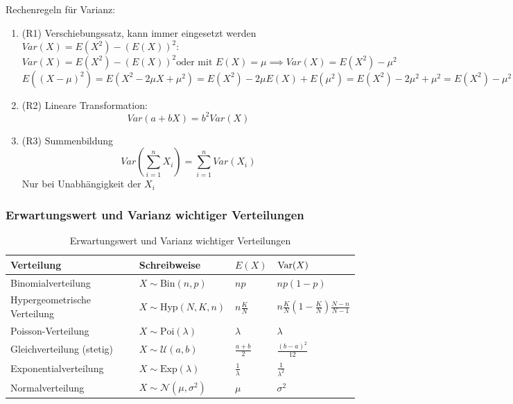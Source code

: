 \documentclass[a4paper]{article}
\begin{document}
Rechenregeln für Varianz:

\begin{enumerate}
    \item (R1) Verschiebungssatz, kann immer eingesetzt werden $Var(X) = E(X^2) - (E(X))^2$: 
    \[
    Var(X) = E(X^2) - (E(X))^2 \text{oder mit } E(X)=\mu \implies Var(X) = E(X^2) - \mu^2
    \]
    \[
    E((X-\mu)^2) = E(X^2-2\mu X + \mu^2) = E(X^2) -2\mu E(X) + E(\mu^2) = E(X^2) -2\mu^2 + \mu^2 = E(X^2) - \mu^2
    \]
    \item (R2) Lineare Transformation:
    \[
    Var(a + bX) = b^2 Var(X)
    \]
    \item (R3) Summenbildung
    \[
    Var(\sum_{i=1}^{n} X_i) = \sum_{i=1}^{n} Var(X_i)
    \]
    Nur bei Unabhängigkeit der $X_i$
\end{enumerate}

\subsubsection{Erwartungswert und Varianz wichtiger Verteilungen}

\begin{table}[h]
    \centering
    \small
    \begin{tabularx}{\textwidth}{|l|l|l|l|}
        \hline
        Verteilung & Schreibweise & $E(X)$ & $\mathrm{Var}(X)$ \\
        \hline
        Binomialverteilung & $X \sim \mathrm{Bin}(n,p)$ & $np$ & $np(1-p)$ \\
        \hline
        Hypergeometrische Verteilung & $X \sim \mathrm{Hyp}(N,K,n)$ & $n\frac{K}{N}$ & $n\frac{K}{N}\left(1-\frac{K}{N}\right)\frac{N-n}{N-1}$ \\
        \hline
        Poisson-Verteilung & $X \sim \mathrm{Poi}(\lambda)$ & $\lambda$ & $\lambda$ \\
        \hline
        Gleichverteilung (stetig) & $X \sim \mathcal{U}(a,b)$ & $\frac{a+b}{2}$ & $\frac{(b-a)^2}{12}$ \\
        \hline
        Exponentialverteilung & $X \sim \mathrm{Exp}(\lambda)$ & $\frac{1}{\lambda}$ & $\frac{1}{\lambda^2}$ \\
        \hline
        Normalverteilung & $X \sim \mathcal{N}(\mu,\sigma^2)$ & $\mu$ & $\sigma^2$ \\
        \hline
    \end{tabularx}
    \caption{Erwartungswert und Varianz wichtiger Verteilungen}
\end{table}
\end{document}
